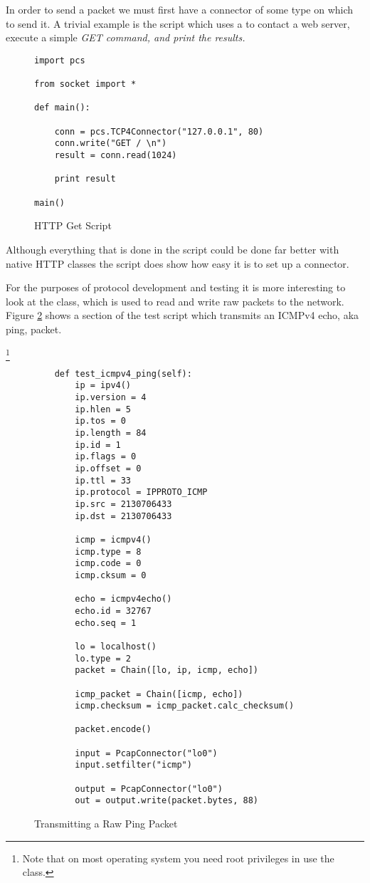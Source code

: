 \documentclass[11pt]{article}
\begin{document}
In order to send a packet we must first have a connector of some type
on which to send it.  A trivial example is the 
script which uses a  to contact a web server,
execute a simple \em{GET} command, and print the results.

\begin{figure}
  \centering
\begin{lstlisting}
import pcs

from socket import *

def main():

    conn = pcs.TCP4Connector("127.0.0.1", 80)
    conn.write("GET / \n")
    result = conn.read(1024)

    print result

main()
\end{lstlisting}
  \caption{HTTP Get Script}
  \label{fig:http-get-script}
\end{figure}

Although everything that is done in the  script
could be done far better with  native HTTP classes
the script does show how easy it is to set up a connector.

For the purposes of protocol development and testing it is more
interesting to look at the  class, which is used
to read and write raw packets to the network.  Figure
\ref{fig:transmitting-a-raw-ping-packet} shows a section of the
 test script which transmits an ICMPv4 echo, aka
ping, packet.  

\footnote{Note that on most operating system you need root privileges
  in use the  class.}

\begin{figure}
  \centering
\begin{lstlisting}
    def test_icmpv4_ping(self):
        ip = ipv4()
        ip.version = 4
        ip.hlen = 5
        ip.tos = 0
        ip.length = 84
        ip.id = 1
        ip.flags = 0
        ip.offset = 0
        ip.ttl = 33
        ip.protocol = IPPROTO_ICMP
        ip.src = 2130706433
        ip.dst = 2130706433

        icmp = icmpv4()
        icmp.type = 8
        icmp.code = 0
        icmp.cksum = 0
        
        echo = icmpv4echo()
        echo.id = 32767
        echo.seq = 1

        lo = localhost()
        lo.type = 2
        packet = Chain([lo, ip, icmp, echo])
        
        icmp_packet = Chain([icmp, echo])
        icmp.checksum = icmp_packet.calc_checksum()

        packet.encode()

        input = PcapConnector("lo0")
        input.setfilter("icmp")

        output = PcapConnector("lo0")
        out = output.write(packet.bytes, 88)
\end{lstlisting}
  \caption{Transmitting a Raw Ping Packet}
  \label{fig:transmitting-a-raw-ping-packet}
\end{figure}
\end{document}
